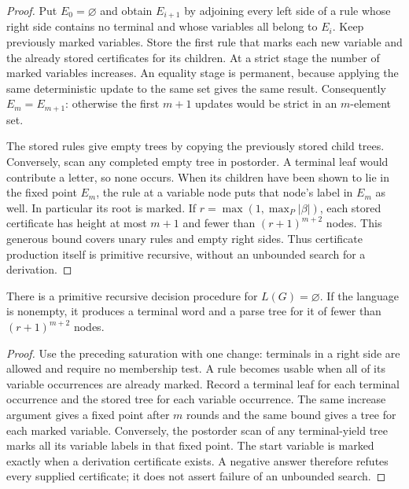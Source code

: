 \begin{proof}
Put $E_0=\varnothing$ and obtain $E_{i+1}$ by adjoining every left side of a
rule whose right side contains no terminal and whose variables all belong
to $E_i$.  Keep previously marked variables.  Store the first rule that
marks each new variable and the already stored certificates for its children.
At a strict stage the number of marked variables increases.  An equality
stage is permanent, because applying the same deterministic update to the
same set gives the same result.  Consequently $E_m=E_{m+1}$: otherwise the
first $m+1$ updates would be strict in an $m$-element set.

The stored rules give empty trees by copying the previously stored child
trees.  Conversely, scan any completed empty tree in postorder.  A terminal
leaf would contribute a letter, so none occurs.  When its children have
been shown to lie in the fixed point $E_m$, the rule at a variable node
puts that node's label in $E_m$ as well.  In particular its root is marked.
If $r=\max(1,\max_{P}|\beta|)$, each stored certificate has height at most
$m+1$ and fewer than $(r+1)^{m+2}$ nodes.  This generous bound covers unary
rules and empty right sides.  Thus certificate production itself is
primitive recursive, without an unbounded search for a derivation.
\end{proof}

\begin{theorem}
\label{cf:emptiness}
There is a primitive recursive decision procedure for $L(G)=\varnothing$.
If the language is nonempty, it produces a terminal word and a parse tree
for it of fewer than $(r+1)^{m+2}$ nodes.
\end{theorem}

\begin{proof}
Use the preceding saturation with one change: terminals in a right side
are allowed and require no membership test.  A rule becomes usable when
all of its variable occurrences are already marked.  Record a terminal
leaf for each terminal occurrence and the stored tree for each variable
occurrence.  The same increase argument gives a fixed point after $m$
rounds and the same bound gives a tree for each marked variable.  Conversely,
the postorder scan of any terminal-yield tree marks all its variable labels
in that fixed point.  The start variable is marked exactly when a derivation
certificate exists.  A negative answer therefore refutes every supplied
certificate; it does not assert failure of an unbounded search.
\end{proof}


